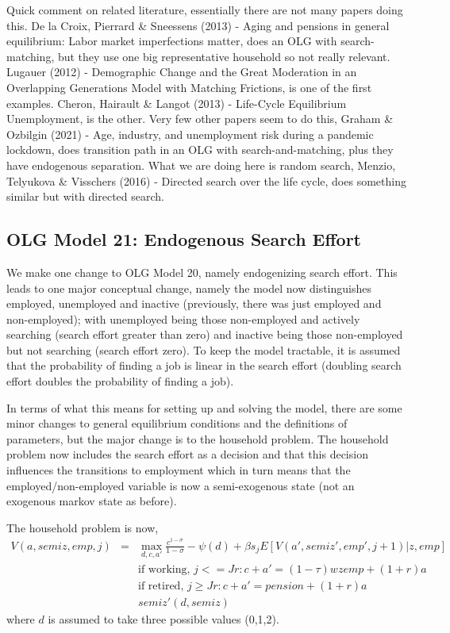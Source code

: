 Quick comment on related literature, essentially there are not many papers doing this. De la Croix, Pierrard \& Sneessens (2013) - Aging and pensions in general equilibrium: Labor market imperfections matter, does an OLG with search-matching, but they use one big representative household so not really relevant. Lugauer (2012) - Demographic Change and the Great Moderation in an Overlapping Generations Model with Matching Frictions, is one of the first examples. Cheron, Hairault \& Langot (2013) - Life-Cycle Equilibrium Unemployment, is the other. Very few other papers seem to do this, Graham \& Ozbilgin (2021) - Age, industry, and unemployment risk during a pandemic lockdown, does transition path in an OLG with search-and-matching, plus they have endogenous separation. What we are doing here is random search, Menzio, Telyukova \& Visschers (2016) - Directed search over the life cycle, does something similar but with directed search.

\subsection{OLG Model 21: Endogenous Search Effort}
We make one change to OLG Model 20, namely endogenizing search effort. This leads to one major conceptual change, namely the model now distinguishes employed, unemployed and inactive (previously, there was just employed and non-employed); with unemployed being those non-employed and actively searching (search effort greater than zero) and inactive being those non-employed but not searching (search effort zero). To keep the model tractable, it is assumed that the probability of finding a job is linear in the search effort (doubling search effort doubles the probability of finding a job).

In terms of what this means for setting up and solving the model, there are some minor changes to general equilibrium conditions and the definitions of parameters, but the major change is to the household problem. The household problem now includes the search effort as a decision and that this decision influences the transitions to employment which in turn means that the employed/non-employed variable is now a semi-exogenous state (not an exogenous markov state as before).

The household problem is now,
\begin{eqnarray*}
 V(a,semiz,emp,j)&=& \max_{d,c,a'} \frac{c^{1-\sigma}}{1-\sigma}-\psi(d) + \beta s_j E[V(a',semiz',emp',j+1)|z,emp] \\
&&\text{if working, }j<=Jr: c+a'= (1-\tau) w z emp + (1+r) a \\
&&\text{if retired, }j\geq Jr: c+a'=pension+ (1+r) a  \\
&& semiz'(d,semiz)
\end{eqnarray*}
where $d$ is assumed to take three possible values (0,1,2).

